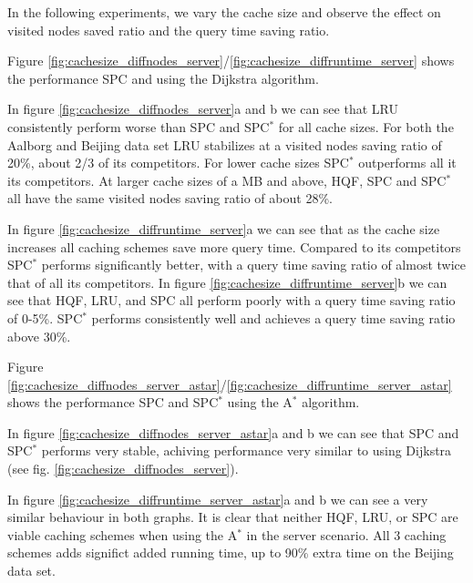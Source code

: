 {\color{red}
In the following experiments, we vary the cache size and observe the effect on visited nodes saved ratio and the query time saving ratio.




Figure \ref{fig:cachesize_diffnodes_server}/\ref{fig:cachesize_diffruntime_server} shows the performance SPC and  using the Dijkstra \spath algorithm.

In figure \ref{fig:cachesize_diffnodes_server}a and b we can see that LRU consistently perform worse than SPC and SPC$^*$ for all cache sizes. For both the Aalborg and Beijing data set LRU stabilizes at a visited nodes saving ratio of 20\%, about 2/3 of its competitors. 
For lower cache sizes SPC$^*$ outperforms all it its competitors. At larger cache sizes of a MB and above, HQF, SPC and SPC$^*$ all have the same visited nodes saving ratio of about 28\%.

In figure \ref{fig:cachesize_diffruntime_server}a we can see that as the cache size increases all caching schemes save more query time. Compared to its competitors SPC$^*$ performs significantly better, with a query time saving ratio of almost twice that of all its competitors. 
In figure \ref{fig:cachesize_diffruntime_server}b we can see that HQF, LRU, and SPC all perform poorly with a query time saving ratio of 0-5\%. SPC$^*$ performs consistently well and achieves a query time saving ratio above 30\%.


Figure \ref{fig:cachesize_diffnodes_server_astar}/\ref{fig:cachesize_diffruntime_server_astar} shows the performance SPC and SPC$^*$ using the A$^*$ \spath algorithm.

In figure \ref{fig:cachesize_diffnodes_server_astar}a and b we can see that SPC and SPC$^*$ performs very stable, achiving performance very similar to using Dijkstra (see fig. \ref{fig:cachesize_diffnodes_server}).

In figure \ref{fig:cachesize_diffruntime_server_astar}a and b we can see a very similar behaviour in both graphs. It is clear that neither HQF, LRU, or SPC are viable caching schemes when using the A$^*$ in the server scenario. All 3 caching schemes adds significt added running time, up to 90\% extra time on the Beijing data set.
}





